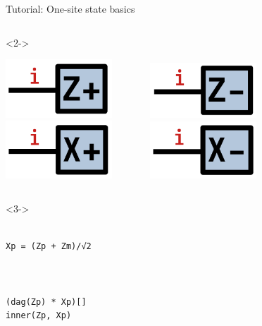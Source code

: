 \begin{frame}[fragile]{Tutorial: One-site state basics}
\begin{columns}
\begin{column}[T]{0.6\textwidth}
\begin{onlyenv}<2->
\vspace*{-0.4cm}
\begin{center}
\includegraphics[width=0.3\textwidth]{
  slides/assets/Zp.png
} \ \ \ \ \ \ \ 
\includegraphics[width=0.3\textwidth]{
  slides/assets/Zm.png
} \\
\includegraphics[width=0.3\textwidth]{
  slides/assets/Xp.png
} \ \ \ \ \ \ \ 
\includegraphics[width=0.3\textwidth]{
  slides/assets/Xm.png
}
\end{center}
\end{onlyenv}
\end{column}

\end{columns}

\begin{columns}

\begin{column}[T]{0.45\textwidth}
\begin{onlyenv}<3->
~\\
~\\
\begin{lstlisting}[language=JuliaLocal, style=julia, basicstyle=\scriptsize\ttfamily]
Xp = (Zp + Zm)/√2



(dag(Zp) * Xp)[]
inner(Zp, Xp)
\end{lstlisting}
\end{onlyenv}
\end{column}


\end{columns}
\end{frame}

